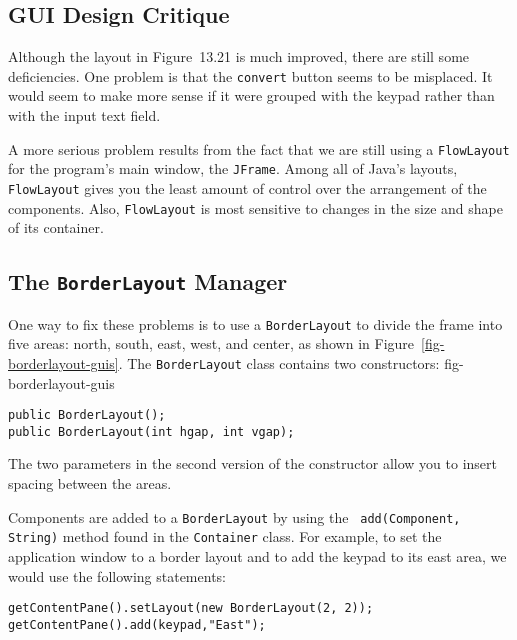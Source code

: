 \subsection{GUI Design Critique}
\noindent Although the layout in Figure~13.21 is much
improved, there are still some deficiencies.  One problem is
that the {\tt convert} button seems to be misplaced.   It would seem to
make more sense if it were grouped with the keypad rather
than with the input text field.

A more serious problem results from the fact that we are still using a
{\tt FlowLayout} for the program's main window, the
{\tt JFrame}. Among all of Java's layouts, {\tt FlowLayout} gives you the
least amount of control over the arrangement of the components.  Also,
{\tt FlowLayout} is most sensitive to changes in the size and shape of
its container.

\subsection{The {\tt BorderLayout} Manager}
\noindent One way to fix these problems is to use a {\tt BorderLayout} to divide
the frame into five areas: north, south, east, west, and center, as
shown in Figure~\ref{fig-borderlayout-guis}. The {\tt BorderLayout} class contains two constructors:
{fig-borderlayout-guis}

\begin{jjjlisting}
\begin{lstlisting}
public BorderLayout();
public BorderLayout(int hgap, int vgap);
\end{lstlisting}
\end{jjjlisting}

\noindent The two parameters in the second version of the constructor
allow you to insert spacing between the areas.

Components are added to a {\tt BorderLayout} by using the {\tt
add(Com\-po\-nent, String)} method found in the {\tt Container} class.
For example, to set the application window to a border layout and to
add the keypad to its east area, we would use the following
statements:

\begin{jjjlisting}
\begin{lstlisting}
getContentPane().setLayout(new BorderLayout(2, 2));
getContentPane().add(keypad,"East");
\end{lstlisting}
\end{jjjlisting}

